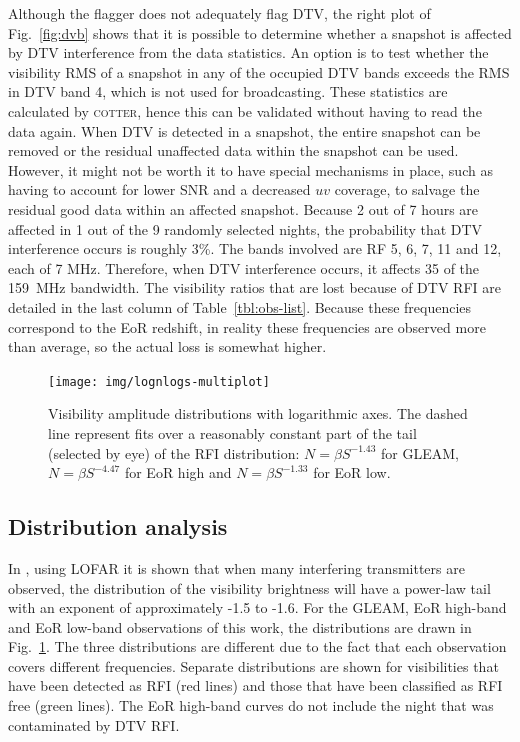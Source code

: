 \documentclass{pasa}
\begin{document}
Although the flagger does not adequately flag DTV, the right plot of Fig.~\ref{fig:dvb} shows that it is possible to determine whether a snapshot is affected by DTV interference from the data statistics. An option is to test whether the visibility RMS of a snapshot in any of the occupied DTV bands exceeds the RMS in DTV band 4, which is not used for broadcasting. These statistics are calculated by \textsc{cotter}, hence this can be validated without having to read the data again. When DTV is detected in a snapshot, the entire snapshot can be removed or the residual unaffected data within the snapshot can be used. However, it might not be worth it to have special mechanisms in place, such as having to account for lower SNR and a decreased $uv$ coverage, to salvage the residual good data within an affected snapshot. Because 2 out of 7 hours are affected in 1 out of the 9 randomly selected nights, the probability that DTV interference occurs is roughly 3\%. The bands involved are RF 5, 6, 7, 11 and 12, each of 7 MHz. Therefore, when DTV interference occurs, it affects 35 of the 159~MHz bandwidth. The visibility ratios that are lost because of DTV RFI are detailed in the last column of Table~\ref{tbl:obs-list}. Because these frequencies correspond to the EoR redshift, in reality these frequencies are observed more than average, so the actual loss is somewhat higher.

\noindent\begin{figure}
\begin{center}\hspace*{-0.2cm}\texttt{[image: img/lognlogs-multiplot]}
\caption{Visibility amplitude distributions with logarithmic axes. The dashed line represent fits over a reasonably constant part of the tail (selected by eye) of the RFI distribution: $N=\beta S^{-1.43}$ for GLEAM, $N=\beta S^{-4.47}$ for EoR high and $N=\beta S^{-1.33}$ for EoR low.}
\label{fig:lognlogs}
\end{center}
\end{figure}

\subsection{Distribution analysis}
In \citet{offringa-rfi-distributions}, using LOFAR it is shown that when many interfering transmitters are observed, the distribution of the visibility brightness will have a power-law tail with an exponent of approximately -1.5 to -1.6. For the GLEAM, EoR high-band and EoR low-band observations of this work, the distributions are drawn in Fig.~\ref{fig:lognlogs}. The three distributions are different due to the fact that each observation covers different frequencies.  Separate distributions are shown for visibilities that have been detected as RFI (red lines) and those that have been classified as RFI free (green lines). The EoR high-band curves do not include the night that was contaminated by DTV RFI.
\end{document}
